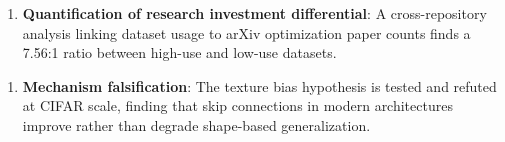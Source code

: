 \begin{enumerate}
\item \textbf{Quantification of research investment differential}: A cross-repository analysis linking dataset usage to arXiv optimization paper counts finds a 7.56:1 ratio between high-use and low-use datasets.
\end{enumerate}

\begin{enumerate}
\item \textbf{Mechanism falsification}: The texture bias hypothesis is tested and refuted at CIFAR scale, finding that skip connections in modern architectures improve rather than degrade shape-based generalization.
\end{enumerate}

